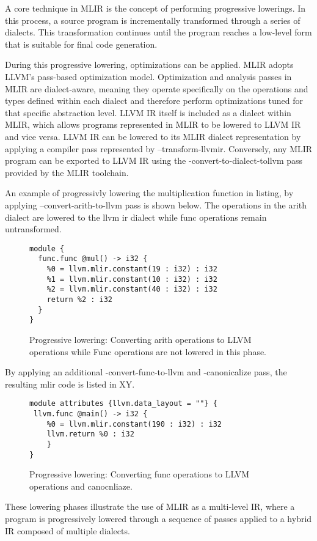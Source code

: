 A core technique in MLIR is the concept of performing progressive lowerings. In this process, a source program is incrementally transformed through a series of dialects. This transformation continues until the program reaches a low-level form that is suitable for final code generation. 

During this progressive lowering, optimizations can be applied. MLIR adopts LLVM’s pass-based optimization model. Optimization and analysis passes in MLIR are dialect-aware, meaning they operate specifically on the operations and types defined within each dialect and therefore perform optimizations tuned for that specific abstraction level.
LLVM IR itself is included as a dialect within MLIR, which allows programs represented in MLIR to be lowered to LLVM IR and vice versa.
LLVM IR can be lowered to its MLIR dialect representation by applying a compiler pass represented by --transform-llvmir. Conversely, any MLIR program can be exported to LLVM IR using the  -convert-to-dialect-tollvm pass provided by the MLIR toolchain.

An example of progressivly lowering the multiplication function in listing, by applying --convert-arith-to-llvm pass is shown below. The operations in the arith dialect are lowered to the llvm ir dialect while func operations remain untransformed. 
\begin{figure}[ht]
\centering
\begin{lstlisting}[language=mlir, basicstyle=\ttfamily\small]
module {
  func.func @mul() -> i32 {
    %0 = llvm.mlir.constant(19 : i32) : i32
    %1 = llvm.mlir.constant(10 : i32) : i32 
    %2 = llvm.mlir.constant(40 : i32) : i32
    return %2 : i32
  }
}
\end{lstlisting}
\caption{ Progressive lowering: Converting arith operations to LLVM operations while Func operations are not lowered in this phase. }
\label{fig:mlir-addition}
\end{figure}
By applying an additional -convert-func-to-llvm and -canonicalize pass, the resulting mlir code is listed in XY. 
\begin{figure}[ht]
\centering
\begin{lstlisting}[language=mlir, basicstyle=\ttfamily\small]
module attributes {llvm.data_layout = ""} { 
 llvm.func @main() -> i32 {
    %0 = llvm.mlir.constant(190 : i32) : i32 
    llvm.return %0 : i32
    } 
}
\end{lstlisting}
\caption{ Progressive lowering: Converting func operations to LLVM operations and canocnliaze. }
\label{fig:mlir-addition}
\end{figure}
These lowering phases illustrate the use of MLIR as a multi-level IR, where a program is progressively lowered through a sequence of passes applied to a hybrid IR composed of multiple dialects.

